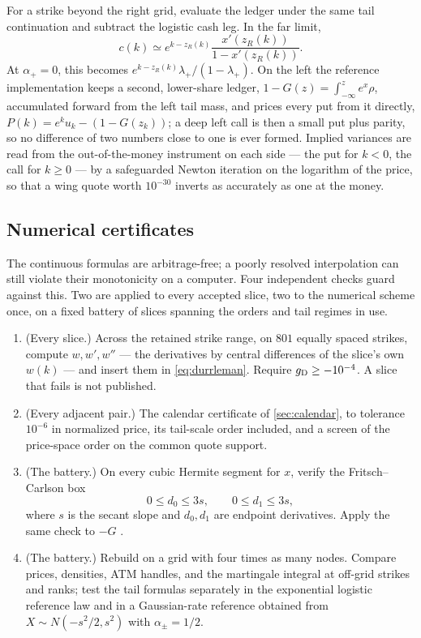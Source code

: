 For a strike beyond the right grid, evaluate the ledger under the same tail
continuation and subtract the logistic cash leg.  In the far limit,
\begin{equation}
c(k)\simeq e^{k-z_R(k)}
\frac{x'(z_R(k))}{1-x'(z_R(k))}.
\label{eq:beyondgrid}
\end{equation}
At $\alpha_+=0$, this becomes
$e^{k-z_R(k)}\lambda_+/(1-\lambda_+)$.  On the left the reference
implementation keeps a second, lower-share ledger,
$1-G(z)=\int_{-\infty}^{z}e^{x}\rho$, accumulated forward from the
left tail mass, and prices every put from it directly,
$P(k)=e^{k}u_k-(1-G(z_k))$; a deep left call is then a small put plus
parity, so no difference of two numbers close to one is ever formed.
Implied variances are read from the out-of-the-money instrument on
each side --- the put for $k<0$, the call for $k\ge0$ --- by a
safeguarded Newton iteration on the logarithm of the price, so that a
wing quote worth $10^{-30}$ inverts as accurately as one at the money.

\subsection{Numerical certificates}
\label{sec:certificates}

The continuous formulas are arbitrage-free; a poorly resolved interpolation
can still violate their monotonicity on a computer.  Four independent checks
guard against this.  Two are applied to every accepted slice, two to
the numerical scheme once, on a fixed battery of slices spanning the
orders and tail regimes in use.

\begin{enumerate}
\item (Every slice.)  Across the retained strike range, on $801$
equally spaced strikes, compute $w,w',w''$ --- the derivatives by
central differences of the slice's own $w(k)$ --- and insert them in
\eqref{eq:durrleman}.  Require $g_{\rm D}\ge-10^{-4}$.  A slice
that fails is not published.
\item (Every adjacent pair.)  The calendar certificate of
\cref{sec:calendar}, to tolerance $10^{-6}$ in normalized price, its
tail-scale order included, and
a screen of the price-space order on the common quote support.
\item (The battery.)  On every cubic Hermite segment for $x$, verify the
Fritsch--Carlson box
\[
0\le d_0\le3s,\qquad 0\le d_1\le3s,
\]
where $s$ is the secant slope and $d_0,d_1$ are endpoint derivatives.  Apply
the same check to $-G$ \citep{FritschCarlson1980}.
\item (The battery.)  Rebuild on a grid with four times as many nodes.
Compare prices, densities, ATM handles, and the martingale integral at
off-grid strikes and ranks; test the tail formulas separately in the
exponential logistic reference law and in a Gaussian-rate reference
obtained from $X\sim N(-s^2/2,s^2)$ with $\alpha_\pm=1/2$.
\end{enumerate}


